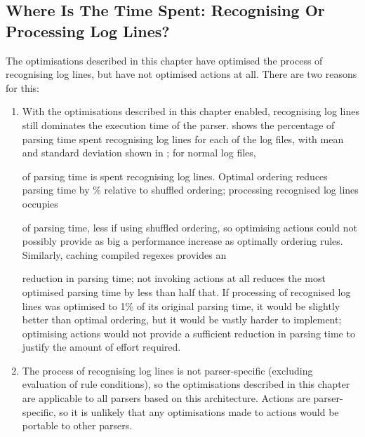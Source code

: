 \FloatBarrier{}

\subsection{Where Is The Time Spent: Recognising Or Processing Log Lines?}

\label{recognising vs processing}

The optimisations described in this chapter have optimised the process of
recognising log lines, but have not optimised actions at all.  There are
two reasons for this:

\begin{enumerate}

    \item With the optimisations described in this chapter enabled,
        recognising log lines still dominates the execution time of the
        parser.   shows the percentage of parsing time spent recognising
        log lines for each of the \numberOFlogFILES{} log files, with mean
        and standard deviation shown in ; for normal log files,
        
        of parsing time is spent recognising log lines.  Optimal ordering
        reduces parsing time by
        \%
        relative to shuffled ordering; processing recognised log lines
        occupies
        
        of parsing time, less if using shuffled ordering, so optimising
        actions could not possibly provide as big a performance increase as
        optimally ordering rules.  Similarly, caching compiled regexes
        provides an
        
        reduction in parsing time; not invoking actions at all reduces the
        most optimised parsing time by less than half that.  If processing
        of recognised log lines was optimised to 1\% of its original
        parsing time, it would be slightly better than optimal ordering,
        but it would be vastly harder to implement; optimising actions
        would not provide a sufficient reduction in parsing time to justify
        the amount of effort required.

    \item The process of recognising log lines is not parser-specific
        (excluding evaluation of rule conditions), so the optimisations
        described in this chapter are applicable to all parsers based on
        this architecture.  Actions are parser-specific, so it is unlikely
        that any optimisations made to actions would be portable to other
        parsers.

\end{enumerate}

